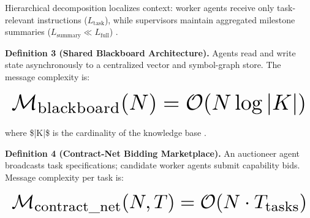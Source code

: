 \documentclass[10pt,journal,compsoc,twocolumn]{IEEEtran}
\begin{document}
Hierarchical decomposition localizes context: worker agents receive only task-relevant instructions ($L_{\text{task}}$), while supervisors maintain aggregated milestone summaries ($L_{\text{summary}} \ll L_{\text{full}}$) \cite{arxiv_2406_00584}.

\textbf{Definition 3 (Shared Blackboard Architecture).} Agents read and write state asynchronously to a centralized vector and symbol-graph store. The message complexity is:



















\begin{equation}
\resizebox{\columnwidth}{!}{$\displaystyle
\begin{aligned}
\mathcal{M}_{\text{blackboard}}(N) = \mathcal{O}(N \log |K|)
\end{aligned}
$}
\end{equation}



















where \$|K|\$ is the cardinality of the knowledge base \cite{crossref_10_1145_3689096_3689462}.

\textbf{Definition 4 (Contract-Net Bidding Marketplace).} An auctioneer agent broadcasts task specifications; candidate worker agents submit capability bids. Message complexity per task is:



















\begin{equation}
\resizebox{\columnwidth}{!}{$\displaystyle
\begin{aligned}
\mathcal{M}_{\text{contract\_net}}(N, T) = \mathcal{O}(N \cdot T_{\text{tasks}})
\end{aligned}
$}
\end{equation}
\end{document}
